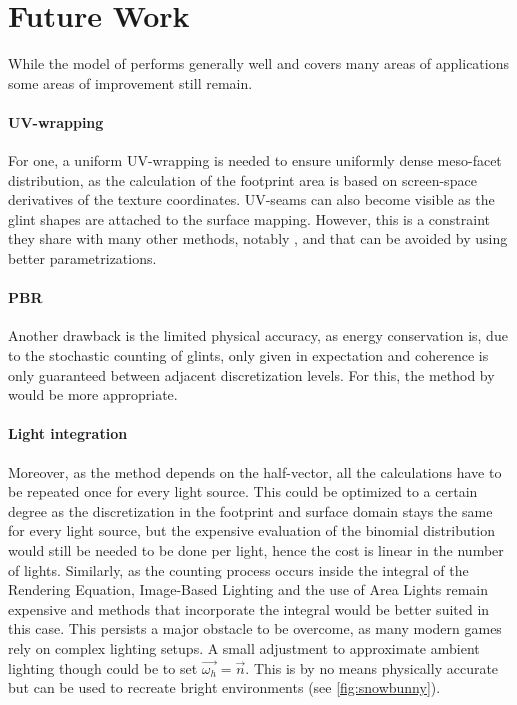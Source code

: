 \section{Future Work}
\label{sec:future-work}

While the model of \textcite{deliot2023} performs generally well and covers many areas of applications some areas of improvement still remain.


\paragraph{UV-wrapping}
%
For one, a uniform UV-wrapping is needed to ensure uniformly dense meso-facet distribution, as the calculation of the footprint area is based on screen-space derivatives of the texture coordinates.
%
UV-seams can also become visible as the glint shapes are attached to the surface mapping.
%
However, this is a constraint they share with many other methods, notably \textcite{zirr2016}, and that can be avoided by using better parametrizations.

\paragraph{PBR}
%
Another drawback is the limited physical accuracy, as energy conservation is, due to the stochastic counting of glints, only given in expectation and coherence is only guaranteed between adjacent discretization levels.
%
For this, the method by \Textcite[e.g.][]{chermain2020a} would be more appropriate.

\paragraph{Light integration}
%
Moreover, as the method depends on the half-vector, all the calculations have to be repeated once for every light source.
%
This could be optimized to a certain degree as the discretization in the footprint and surface domain stays the same for every light source, but the expensive evaluation of the binomial distribution would still be needed to be done per light, hence the cost is linear in the number of lights.
%
Similarly, as the counting process occurs inside the integral of the Rendering Equation, Image-Based Lighting and the use of Area Lights remain expensive and methods that incorporate the integral \parencite[e.g.][]{wang2020} would be better suited in this case.
%
This persists a major obstacle to be overcome, as many modern games rely on complex lighting setups.
%
A small adjustment to approximate ambient lighting though could be to set $\vec{\omega_h}=\vec{n}$.
%
This is by no means physically accurate but can be used to recreate bright environments (see \cref{fig:snowbunny}).

